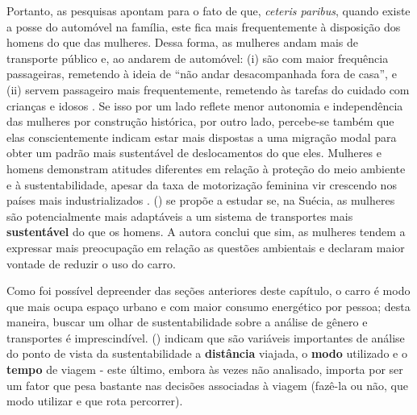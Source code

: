 

Portanto, as pesquisas apontam para o fato de que, \emph{ceteris paribus}, quando existe a posse do automóvel na família, este fica mais frequentemente à disposição dos homens do que das mulheres.
Dessa forma, as mulheres andam mais de transporte público e, ao andarem de automóvel: (i) são com maior frequência passageiras, remetendo à ideia de ``não andar desacompanhada fora de casa'', e (ii) servem passageiro mais frequentemente, remetendo às tarefas do cuidado \cite{HIRATA2012} com crianças e idosos \cite{ROSENBLOOM2000,ROSENBLOOM2003}.
Se isso por um lado reflete menor autonomia e independência das mulheres por construção histórica, por outro lado, percebe-se também que elas conscientemente indicam estar mais dispostas a uma migração modal para obter um padrão mais sustentável de deslocamentos do que eles. Mulheres e homens demonstram atitudes diferentes em relação à proteção do meio ambiente e à sustentabilidade, apesar da taxa de motorização feminina vir crescendo nos países mais industrializados \cite{ROOT1999}.  (\citeyear{POLK2003}) se propõe a estudar se, na Suécia, as mulheres são potencialmente mais adaptáveis a um sistema de transportes mais \textbf{sustentável} do que os homens. A autora conclui que sim, as mulheres tendem a expressar mais preocupação em relação as questões ambientais e declaram maior vontade de reduzir o uso do carro. 

Como foi possível depreender das seções anteriores deste capítulo, o carro é modo que mais ocupa espaço urbano e com maior consumo energético por pessoa; desta maneira, buscar um olhar de sustentabilidade sobre a análise de gênero e transportes é imprescindível.  (\citeyear{SCHWANEN2002}) indicam que são variáveis importantes de análise do ponto de vista da sustentabilidade a \textbf{distância} viajada, o \textbf{modo} utilizado e o \textbf{tempo} de viagem - este último, embora às vezes não analisado, importa por ser um fator que pesa bastante nas decisões associadas à viagem (fazê-la ou não, que modo utilizar e que rota percorrer).


 


